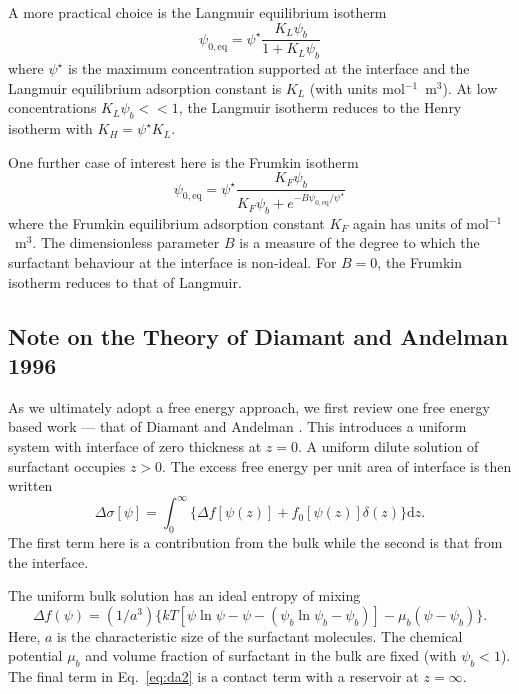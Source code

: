 A more practical choice is the Langmuir equilibrium isotherm
\begin{equation}
\psi_{0,\mathrm{eq}} = \psi^\star \frac{K_L \psi_b}{1 + K_L \psi_b}
\label{eq:iso:langmuir}
\end{equation}
where $\psi^\star$ is the maximum concentration supported at the
interface and the Langmuir equilibrium adsorption constant is $K_L$
(with units mol$^{-1}$~m$^3$). At low concentrations $ K_L\psi_b << 1$,
the Langmuir isotherm reduces to the Henry isotherm with
$K_H = \psi^\star K_L$.

One further case of interest here is the Frumkin isotherm
\begin{equation}
\psi_{0, \mathrm{eq}} = \psi^\star
\frac{K_F \psi_b}{K_F\psi_b + e^{-B\psi_{0,\mathrm{eq}} / \psi^\star}}
\label{eq:iso:frumkin}
\end{equation}
where the Frumkin equilibrium adsorption constant $K_F$ again
has units of mol$^{-1}$~m$^3$. The dimensionless parameter $B$
 is a measure of the degree to which the surfactant behaviour
at the interface is non-ideal. For $B=0$, the Frumkin isotherm
reduces to that of Langmuir.

\subsection{Note on the Theory of Diamant and Andelman 1996}

As we ultimately adopt a free energy approach, we first review one
free energy based work --- that of Diamant and Andelman
\cite{diamant96}. This introduces a uniform system with interface
of zero thickness at $z = 0$. A uniform dilute solution of
surfactant occupies $z > 0$. The excess free energy per unit area
of interface is then written
\begin{equation}
\Delta\sigma [\psi] = \int_0^\infty  \big\{ \Delta f[\psi (z)] +
f_0 [\psi (z) ] \delta(z)  \big\} \mathrm{d}z. 
\end{equation}
The first term here is a contribution from the bulk while the
second is that from the interface. 

The uniform bulk solution has an ideal entropy of mixing
\begin{equation}
\Delta f(\psi) = (1/a^3)
\big\{ kT[\psi \ln\psi - \psi - (\psi_b \ln\psi_b - \psi_b)]
- \mu_b (\psi - \psi_b) \big\}.
\label{eq:da2}
\end{equation}
Here, $a$ is the characteristic size of the surfactant molecules.
The chemical potential $\mu_b$ and volume fraction of surfactant
in the bulk are fixed (with $\psi_b < 1$). The final term in
Eq.~\ref{eq:da2} is a contact term with a reservoir at $z = \infty$.

